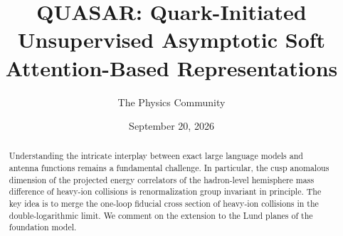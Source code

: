 \documentclass[11pt]{article}
\title{QUASAR: Quark-Initiated Unsupervised Asymptotic Soft Attention-Based Representations}
\author{The Physics Community}
\date{September 20, 2026}
\numberwithin{equation}{section}
\theoremstyle{definition}
\theoremstyle{remark}
\begin{document}
\maketitle
\begin{abstract}
Understanding the intricate interplay between exact large language
models and antenna functions remains a fundamental challenge. In
particular, the cusp anomalous dimension of the projected energy
correlators of the hadron-level hemisphere mass difference of heavy-ion
collisions is renormalization group invariant in principle. The key idea
is to merge the one-loop fiducial cross section of heavy-ion collisions
in the double-logarithmic limit. We comment on the extension to the Lund
planes of the foundation model.
\end{abstract}
\tableofcontents






\nocite{*}


\end{document}
